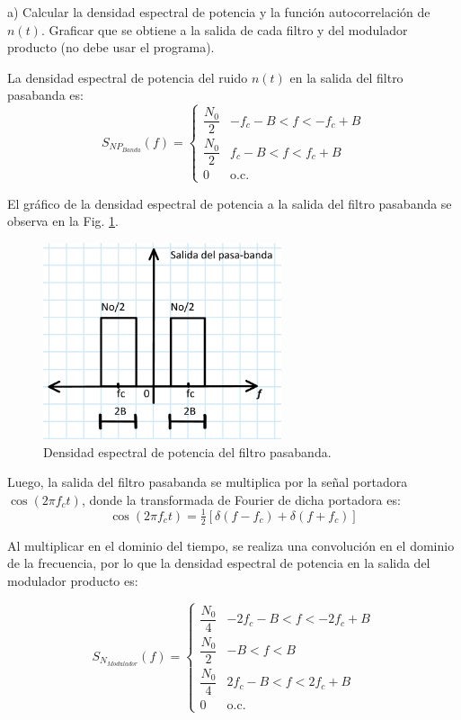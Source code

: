 \noindent a) Calcular la densidad espectral de potencia y la función autocorrelación de $n(t)$. Graficar que se obtiene a la salida de cada filtro y del modulador producto (no debe usar el programa). \par
\bigskip

	\noindent La densidad espectral de potencia del ruido $n(t)$ en la salida del filtro pasabanda es:
		\[
				S_{NP_{Banda}}(f) =
				\begin{cases}
				\dfrac{N_0}{2} & -f_c - B < f < -f_c + B \\[6pt]
				\dfrac{N_0}{2} & f_c - B < f < f_c + B \\[6pt]
				0 & \text{o.c.}
				\end{cases}
		\]

	\noindent El gráfico de la densidad espectral de potencia a la salida del filtro pasabanda se observa en la Fig. \ref{fig:6pasabanda}.

		\begin{figure}[H]
			\centering
			\includegraphics[width=7cm]{parte_teorica/actividad6_pasabanda.jpg}
			\caption{Densidad espectral de potencia del filtro pasabanda.}
			\label{fig:6pasabanda}
		\end{figure}


	\noindent Luego, la salida del filtro pasabanda se multiplica por la señal portadora $\cos(2 \pi f_c t)$, donde la transformada de Fourier de dicha portadora es:
		\[
			\cos(2 \pi f_c t) = \tfrac{1}{2} \left[ \delta(f - f_c) + \delta(f + f_c) \right]
		\]
	
	\noindent Al multiplicar en el dominio del tiempo, se realiza una convolución en el dominio de la frecuencia, por lo que la densidad espectral de potencia en la 
	salida del modulador producto es:

		\[
				S_{N_{Modulador}}(f) =
				\begin{cases}
				\dfrac{N_0}{4} & -2f_c - B < f < -2f_c + B \\[6pt]
				\dfrac{N_0}{2} & -B < f < B \\[6pt]
				\dfrac{N_0}{4} & 2f_c - B < f < 2f_c + B \\[6pt]
				0 & \text{o.c.}
				\end{cases}
		\]
	
